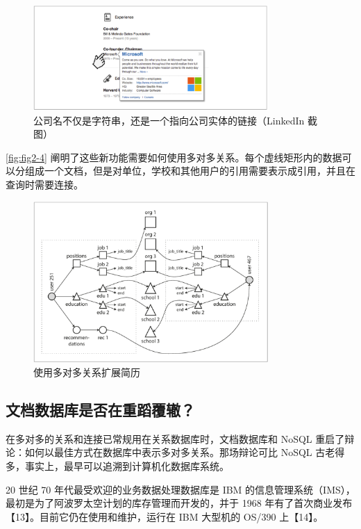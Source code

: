 \begin{figure}
    \centering
    \includegraphics[width=0.8\textwidth]{img/fig2-3.png}
    \caption{公司名不仅是字符串，还是一个指向公司实体的链接（LinkedIn 截图）}
    \label{fig:fig2-3}
\end{figure}

\autoref{fig:fig2-4} 阐明了这些新功能需要如何使用多对多关系。每个虚线矩形内的数据可以分组成一个文档，但是对单位，学校和其他用户的引用需要表示成引用，并且在查询时需要连接。

\begin{figure}
    \centering
    \includegraphics[width=0.8\textwidth]{img/fig2-4.png}
    \caption{使用多对多关系扩展简历}
    \label{fig:fig2-4}
\end{figure}

\subsection{文档数据库是否在重蹈覆辙？}

在多对多的关系和连接已常规用在关系数据库时，文档数据库和 NoSQL 重启了辩论：如何以最佳方式在数据库中表示多对多关系。那场辩论可比 NoSQL 古老得多，事实上，最早可以追溯到计算机化数据库系统。

20 世纪 70 年代最受欢迎的业务数据处理数据库是 IBM 的信息管理系统（IMS），最初是为了阿波罗太空计划的库存管理而开发的，并于 1968 年有了首次商业发布【13】。目前它仍在使用和维护，运行在 IBM 大型机的 OS/390 上【14】。

